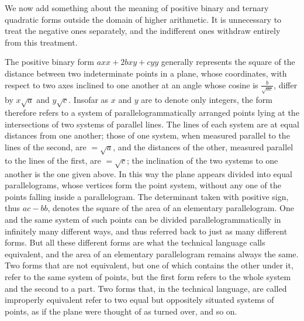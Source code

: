 \documentclass[12pt]{article}
\begin{document}
We now add something about the meaning of positive binary and ternary quadratic forms outside the domain of higher arithmetic. It is unnecessary to treat the negative ones separately, and the indifferent ones withdraw entirely from this treatment.

The positive binary form $axx+2bxy+cyy$ generally represents the square of the distance between two indeterminate points in a plane, whose coordinates, with respect to two axes inclined to one another at an angle whose cosine is $\frac{b}{\sqrt{ac}}$, differ by $x\sqrt a$ and $y\sqrt c$. Insofar as $x$ and $y$ are to denote only integers, the form therefore refers to a system of parallelogrammatically arranged points lying at the intersections of two systems of parallel lines. The lines of each system are at equal distances from one another; those of one system, when measured parallel to the lines of the second, are $=\sqrt a$, and the distances of the other, measured parallel to the lines of the first, are $=\sqrt c$; the inclination of the two systems to one another is the one given above. In this way the plane appears divided into equal parallelograms, whose vertices form the point system, without any one of the points falling inside a parallelogram. The determinant taken with positive sign, thus $ac-bb$, denotes the square of the area of an elementary parallelogram. One and the same system of such points can be divided parallelogrammatically in infinitely many different ways, and thus referred back to just as many different forms. But all these different forms are what the technical language calls equivalent, and the area of an elementary parallelogram remains always the same. Two forms that are not equivalent, but one of which contains the other under it, refer to the same system of points, but the first form refers to the whole system and the second to a part. Two forms that, in the technical language, are called improperly equivalent refer to two equal but oppositely situated systems of points, as if the plane were thought of as turned over, and so on.
\end{document}
